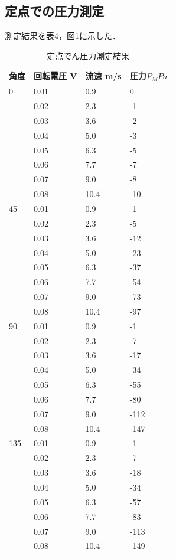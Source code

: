 \documentclass[twocolumn,10pt,a4j]{jsarticle}
\begin{document}
  \subsection{定点での圧力測定}
    測定結果を表4，図1に示した．
    \begin{table}[]
      \centering
        \caption{定点でん圧力測定結果}
        \label{my-label}
        \footnotesize
        \begin{tabular}{llll}
          角度 & 回転電圧 V & 流速 m/s & 圧力$P_{M} Pa$ \\ \hline
          0	 & 0.01 & 	0.9 &  	0 \\
          & 0.02 & 2.3 & -1 \\
          & 0.03 & 3.6 & -2 \\
          & 0.04 & 5.0 & -3 \\
          & 0.05 & 6.3 & -5 \\
          & 0.06 & 7.7 & -7 \\
          & 0.07 & 9.0 & -8 \\
          & 0.08 & 10.4 & -10 \\
                
          45 & 0.01 & 0.9 &	-1 \\
          & 0.02 & 2.3 & -5 \\
          & 0.03 & 3.6 & -12 \\
          & 0.04 & 5.0 & -23  \\
          & 0.05 & 6.3 & -37  \\
          & 0.06 & 7.7 & -54  \\
          & 0.07 & 9.0 & -73  \\
          & 0.08 & 10.4 & -97  \\
                
          90 & 0.01 & 0.9 & -1  \\
          & 0.02 & 2.3 & -7  \\
          & 0.03 & 3.6 & -17  \\
          & 0.04 & 5.0 & -34  \\
          & 0.05 & 6.3 & -55  \\
          & 0.06 & 7.7 & -80  \\
          & 0.07 & 9.0 & -112  \\
          & 0.08 & 10.4 & -147  \\
                
          135 & 0.01 & 0.9 & -1  \\
          & 0.02 & 2.3 & -7  \\
          & 0.03 & 3.6 & -18  \\
          & 0.04 & 5.0 & -34  \\
          & 0.05 & 6.3 & -57  \\
          & 0.06 & 7.7 & -83  \\
          & 0.07 & 9.0 & -113  \\
          & 0.08 & 10.4 & -149  \\
                

\end{tabular}
\end{table}
\end{document}
